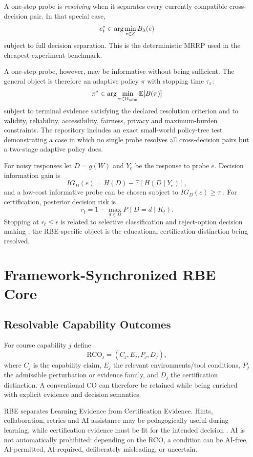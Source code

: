 \documentclass[11pt]{article}
\begin{document}
A one-step probe is \emph{resolving} when it separates every currently compatible cross-decision pair. In that special case,
\[
e_t^*\in\arg\min_{e\in\mathcal E}B_\lambda(e)
\]
subject to full decision separation. This is the deterministic MRRP used in the cheapest-experiment benchmark.

A one-step probe, however, may be informative without being sufficient. The general object is therefore an adaptive policy $\pi$ with stopping time $\tau_\pi$:
\[
\pi^*\in\arg\min_{\pi\in\Pi_{\rm adm}}\mathbb E[B(\pi)]
\]
subject to terminal evidence satisfying the declared resolution criterion and to validity, reliability, accessibility, fairness, privacy and maximum-burden constraints. The repository includes an exact small-world policy-tree test demonstrating a case in which no single probe resolves all cross-decision pairs but a two-stage adaptive policy does.

For noisy responses let $D=g(W)$ and $Y_e$ be the response to probe $e$. Decision information gain is
\[
IG_D(e)=H(D)-\mathbb E[H(D\mid Y_e)],
\]
and a low-cost informative probe can be chosen subject to $IG_D(e)\ge\tau$ \parencite{shannon1948,lindley1956,blackwell1953}. For certification, posterior decision risk is
\[
r_t=1-\max_{d\in D}P(D=d\mid K_t).
\]
Stopping at $r_t\le\epsilon$ is related to selective classification and reject-option decision making \parencite{chow1970,elyaniv2010,gangrade2021}; the RBE-specific object is the educational certification distinction being resolved.

\section{Framework-Synchronized RBE Core}
\subsection{Resolvable Capability Outcomes}
For course capability $j$ define
\[
\mathrm{RCO}_j=(C_j,E_j,P_j,D_j),
\]
where $C_j$ is the capability claim, $E_j$ the relevant environments/tool conditions, $P_j$ the admissible perturbation or evidence family, and $D_j$ the certification distinction. A conventional CO can therefore be retained while being enriched with explicit evidence and decision semantics.

RBE separates Learning Evidence from Certification Evidence. Hints, collaboration, retries and AI assistance may be pedagogically useful during learning, while certification evidence must be fit for the intended decision \parencite{black1998assessment,nicol2006feedback,hattie2007feedback}. AI is not automatically prohibited: depending on the RCO, a condition can be AI-free, AI-permitted, AI-required, deliberately misleading, or uncertain.
\end{document}
